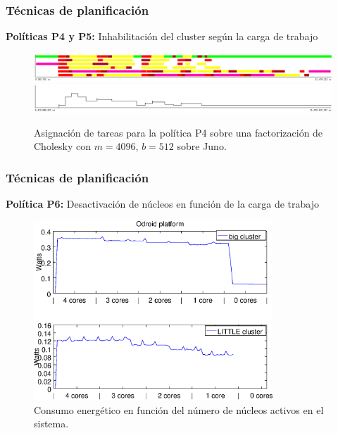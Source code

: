 \documentclass[10pt]{beamer}
\begin{document}
\begin{frame}
  \frametitle{Técnicas de planificación}
  {\bf Políticas P4 y P5:} Inhabilitación del cluster según la carga de
  trabajo
  \vfill
  \begin{figure}
    \centering
\includegraphics[width=1\textwidth]{Figures/Apagado_tareas.png}\\
    \vspace{1cm}
    \includegraphics[width=1\textwidth]{Figures/Apagado_colas.png}
    \caption{Asignación de tareas para la política P4 sobre una
      factorización de Cholesky con $m=4096$, $b=512$ sobre {\sc Juno}.}
  \end{figure}
\end{frame}


\begin{frame}
  \frametitle{Técnicas de planificación}
  {\bf Política P6:} Desactivación de núcleos en función de la carga de
  trabajo
  \vfill
  \begin{figure}
    \centering
    \includegraphics[width=0.8\textwidth]{Plots/modelo_consumo/apagadoOdroid.eps}
    \caption{Consumo energético en función del número de núcleos activos en
      el sistema.}
  \end{figure}
\end{frame}
\end{document}
